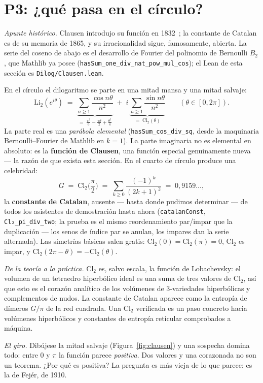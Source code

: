 \documentclass[11pt]{article}
\newcommand{\lean}[1]{\texttt{#1}}
\newcommand{\Li}{\mathrm{Li}_2}
\newcommand{\Cl}{\mathrm{Cl}_2}
\begin{document}
\section{P3: ¿qu\'e pasa en el c\'irculo?}\label{sec:circle}

\emph{Apunte hist\'orico.} Clausen introdujo su funci\'on en 1832~\cite{clausen}; la
constante de Catalan es de su memoria de 1865, y su irracionalidad sigue, famosamente,
abierta. La serie del coseno de abajo es el desarrollo de Fourier del polinomio de
Bernoulli $B_2$, que Mathlib ya posee (\lean{hasSum\_one\_div\_nat\_pow\_mul\_cos}); el
Lean de esta secci\'on es \lean{Dilog/Clausen.lean}.

En el c\'irculo el dilogaritmo se parte en una mitad mansa y una mitad salvaje:
\[
\Li(e^{i\theta}) \;=\;
\underbrace{\sum_{n\ge1}\frac{\cos n\theta}{n^2}}_{\textstyle
  =\;\frac{\pi^2}{6}-\frac{\pi\theta}{2}+\frac{\theta^2}{4}}
\;+\; i\,\underbrace{\sum_{n\ge1}\frac{\sin n\theta}{n^2}}_{\textstyle =\;\Cl(\theta)}
\qquad(\theta\in[0,2\pi]).
\]
La parte real es una \emph{par\'abola elemental} (\lean{hasSum\_cos\_div\_sq}, desde la
maquinaria Bernoulli--Fourier de Mathlib en $k=1$). La parte imaginaria no es elemental
en absoluto: es la \textbf{funci\'on de Clausen}, una funci\'on especial genuinamente
nueva --- la raz\'on de que exista esta secci\'on. En el cuarto de c\'irculo produce una
celebridad:
\[
G \;=\; \Cl\!\Big(\frac{\pi}{2}\Big) \;=\; \sum_{k\ge0}\frac{(-1)^k}{(2k+1)^2}
\;=\;0{,}9159\ldots,
\]
la \textbf{constante de Catalan}, ausente --- hasta donde pudimos determinar --- de todos
los asistentes de demostraci\'on hasta ahora
(\lean{catalanConst}, \lean{Cl₂\_pi\_div\_two}; la prueba es el mismo reordenamiento
par/impar que la duplicaci\'on --- los senos de \'indice par se anulan, los impares dan
la serie alternada). Las simetr\'ias b\'asicas salen gratis: $\Cl(0)=\Cl(\pi)=0$, $\Cl$
es impar, y $\Cl(2\pi-\theta)=-\Cl(\theta)$.

\emph{De la teor\'ia a la pr\'actica.} $\Cl$ es, salvo escala, la funci\'on de
Lobachevsky: el volumen de un tetraedro hiperb\'olico ideal es una suma de tres valores
de $\Cl$, as\'i que esto es el coraz\'on anal\'itico de los vol\'umenes de
$3$-variedades hiperb\'olicas y complementos de nudos. La constante de Catalan aparece
como la entrop\'ia de d\'imeros $G/\pi$ de la red cuadrada. Una $\Cl$ verificada es un
paso concreto hacia vol\'umenes hiperb\'olicos y constantes de entrop\'ia reticular
comprobados a m\'aquina.

\emph{El giro.} Dib\'ujese la mitad salvaje (Figura~\ref{fig:clausen}) y una sospecha
domina todo: entre $0$ y $\pi$ la funci\'on parece \emph{positiva}. Dos valores y una
corazonada no son un teorema. ¿Por qu\'e es positiva? La pregunta es m\'as vieja de lo
que parece: es la de Fej\'er, de 1910.
\end{document}
